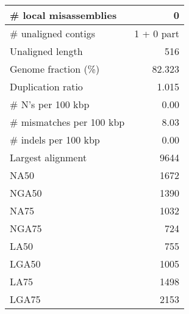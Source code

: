 \documentclass[12pt,a4paper]{article}
\begin{document}
\begin{table}[ht]
\begin{center}
\begin{tabular}{|l*{1}{|r}|}
\# local misassemblies & 0 \\ \hline
\# unaligned contigs & 1 + 0 part \\ \hline
Unaligned length & 516 \\ \hline
Genome fraction (\%) & 82.323 \\ \hline
Duplication ratio & 1.015 \\ \hline
\# N's per 100 kbp & 0.00 \\ \hline
\# mismatches per 100 kbp & 8.03 \\ \hline
\# indels per 100 kbp & 0.00 \\ \hline
Largest alignment & 9644 \\ \hline
NA50 & 1672 \\ \hline
NGA50 & 1390 \\ \hline
NA75 & 1032 \\ \hline
NGA75 & 724 \\ \hline
LA50 & 755 \\ \hline
LGA50 & 1005 \\ \hline
LA75 & 1498 \\ \hline
LGA75 & 2153 \\ \hline
\end{tabular}
\end{center}
\end{table}
\end{document}
